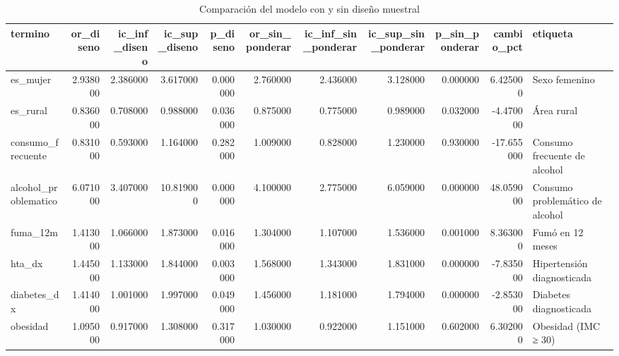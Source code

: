 \begin{table}[htbp]
\caption{Comparación del modelo con y sin diseño muestral}
\label{tab:tabla_23_sensibilidad_diseno_vs_sin_ponderar}
\begin{tabular}{lrrrrrrrrrl}
\toprule
termino & or\_diseno & ic\_inf\_diseno & ic\_sup\_diseno & p\_diseno & or\_sin\_ponderar & ic\_inf\_sin\_ponderar & ic\_sup\_sin\_ponderar & p\_sin\_ponderar & cambio\_pct & etiqueta \\
\midrule
es\_mujer & 2.938000 & 2.386000 & 3.617000 & 0.000000 & 2.760000 & 2.436000 & 3.128000 & 0.000000 & 6.425000 & Sexo femenino \\
es\_rural & 0.836000 & 0.708000 & 0.988000 & 0.036000 & 0.875000 & 0.775000 & 0.989000 & 0.032000 & -4.470000 & Área rural \\
consumo\_frecuente & 0.831000 & 0.593000 & 1.164000 & 0.282000 & 1.009000 & 0.828000 & 1.230000 & 0.930000 & -17.655000 & Consumo frecuente de alcohol \\
alcohol\_problematico & 6.071000 & 3.407000 & 10.819000 & 0.000000 & 4.100000 & 2.775000 & 6.059000 & 0.000000 & 48.059000 & Consumo problemático de alcohol \\
fuma\_12m & 1.413000 & 1.066000 & 1.873000 & 0.016000 & 1.304000 & 1.107000 & 1.536000 & 0.001000 & 8.363000 & Fumó en 12 meses \\
hta\_dx & 1.445000 & 1.133000 & 1.844000 & 0.003000 & 1.568000 & 1.343000 & 1.831000 & 0.000000 & -7.835000 & Hipertensión diagnosticada \\
diabetes\_dx & 1.414000 & 1.001000 & 1.997000 & 0.049000 & 1.456000 & 1.181000 & 1.794000 & 0.000000 & -2.853000 & Diabetes diagnosticada \\
obesidad & 1.095000 & 0.917000 & 1.308000 & 0.317000 & 1.030000 & 0.922000 & 1.151000 & 0.602000 & 6.302000 & Obesidad (IMC ≥ 30) \\
\bottomrule
\end{tabular}
\end{table}
